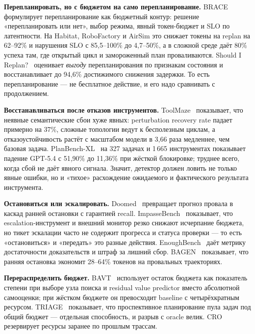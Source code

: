 \documentclass[11pt,a4paper]{article}
\begin{document}
\textbf{Перепланировать, но с бюджетом на само перепланирование.}
BRACE~\cite{liu2026brace} формулирует перепланирование как бюджетный контур:
решение «перепланировать или нет», выбор режима, явный токен-бюджет и SLO
по латентности. На Habitat, RoboFactory и AirSim это снижает токены на
replan на 62--92\% и нарушения SLO с 85{,}5--100\% до 4{,}7--50\%, а в
сложной среде даёт 80\% успеха там, где открытый цикл и замороженный план
проваливаются. Should I Replan?~\cite{zahradka2026replan} оценивает
\emph{выгоду} перепланирования по признакам состояния и восстанавливает до
94{,}6\% достижимого снижения задержки. То есть перепланирование — не
бесплатное действие, и его надо сравнивать с продолжением.

\textbf{Восстанавливаться после отказов инструментов.}
ToolMaze~\cite{zhu2026toolmaze} показывает, что неявные семантические
сбои хуже явных: perturbation recovery rate падает примерно на 37\%,
сложные топологии ведут к бесполезным циклам, а отказоустойчивость растёт
с масштабом модели в 3{,}66 раза медленнее, чем базовая задача.
PlanBench-XL~\cite{liu2026planbench} на 327 задачах и 1\,665 инструментах
показывает падение GPT-5.4 с 51{,}90\% до 11{,}36\% при жёсткой
блокировке; труднее всего, когда сбой не даёт явного сигнала. Значит,
детектор должен ловить не только явные ошибки, но и «тихое» расхождение
ожидаемого и фактического результата инструмента.

\textbf{Остановиться или эскалировать.}
Doomed~\cite{ruan2026doomed} превращает прогноз провала в каскад ранней
остановки с гарантией recall. ImpasseBench~\cite{chen2026stop} показывает,
что escalation-инструмент и внешний монитор резко снижают исчерпание
бюджета, но тикет эскалации часто не содержит прогресса и статуса
проверки — то есть «остановиться» и «передать» это разные действия.
EnoughBench~\cite{almamoori2026enough} даёт метрику достаточности
доказательств и штраф за лишний сбор. BAGEN~\cite{lin2026bagen} показывает,
что ранняя остановка экономит 28--64\% токенов на провальных траекториях.

\textbf{Перераспределить бюджет.}
BAVT~\cite{li2026bavt} использует остаток бюджета как показатель степени
при выборе узла поиска и residual value predictor вместо абсолютной
самооценки; при жёстком бюджете он превосходит baseline с четырёхкратным
ресурсом. TRIAGE~\cite{nazi2026triage} показывает, что проспективное
планирование пула задач под общий бюджет — отдельная способность, и
разрыв с oracle велик. CRO~\cite{shokrnezhad2026cro} резервирует ресурсы
заранее по прошлым трассам.
\end{document}
